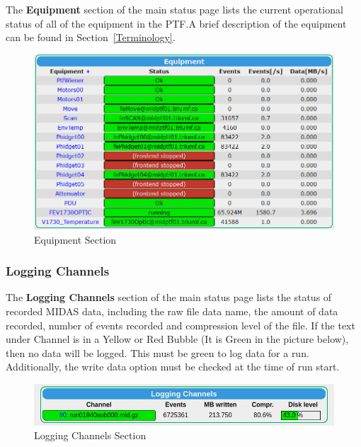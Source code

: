 \documentclass[twoside,letterpaper]{refart}
\begin{document}
The \textbf{Equipment} section of the main status page lists the current operational status of all of the equipment in the PTF.\@ A brief description of the equipment can be found in Section~\ref{Terminology}.

\FloatBarrier

\begin{figure}[!htpb]\centering	
	\includegraphics[width=\textwidth]{images/equipment.png}
	\caption{Equipment Section\label{equipment}}
\end{figure}

\FloatBarrier

\subsubsection{Logging Channels}

The \textbf{Logging Channels} section of the main status page lists the status of recorded MIDAS data, including the raw file data name, the amount of data recorded, number of events recorded and compression level of the file. If the text under Channel is in a Yellow or Red Bubble (It is Green in the picture below), then no data will be logged. This must be green to log data for a run. Additionally, the write data option must be checked at the time of run start.

\FloatBarrier

\begin{figure}[!htpb]\centering	
	\includegraphics[width=\textwidth]{images/loggingChannels.png}
	\caption{Logging Channels Section\label{loggingChannels}}
\end{figure}
\end{document}
